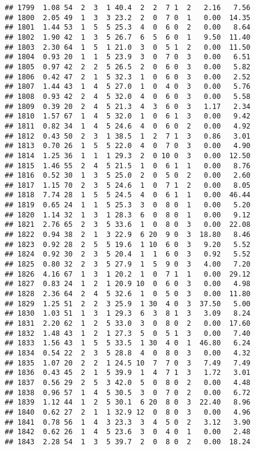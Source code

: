 \documentclass[
]{article}
\begin{document}
\begin{verbatim}
## 1799  1.08 54  2  3  1 40.4  2  2  7 1  2   2.16   7.56
## 1800  2.05 49  1  3  3 23.2  2  0  7 0  1   0.00  14.35
## 1801  1.44 53  1  5  5 25.3  4  0  6 0  2   0.00   8.64
## 1802  1.90 42  1  3  5 26.7  6  5  6 0  1   9.50  11.40
## 1803  2.30 64  1  5  1 21.0  3  0  5 1  2   0.00  11.50
## 1804  0.93 20  1  1  5 23.9  3  0  7 0  3   0.00   6.51
## 1805  0.97 42  2  2  5 26.5  2  0  6 0  3   0.00   5.82
## 1806  0.42 47  2  1  5 32.3  1  0  6 0  3   0.00   2.52
## 1807  1.44 43  1  4  5 27.0  1  0  4 0  3   0.00   5.76
## 1808  0.93 42  2  4  5 32.0  4  0  6 0  3   0.00   5.58
## 1809  0.39 20  2  4  5 21.3  4  3  6 0  3   1.17   2.34
## 1810  1.57 67  1  4  5 32.0  1  0  6 1  3   0.00   9.42
## 1811  0.82 34  1  4  5 24.6  4  0  6 0  2   0.00   4.92
## 1812  0.43 50  2  3  1 38.5  1  2  7 1  3   0.86   3.01
## 1813  0.70 26  1  5  5 22.0  4  0  7 0  3   0.00   4.90
## 1814  1.25 36  1  1  1 29.3  2  0 10 0  3   0.00  12.50
## 1815  1.46 55  2  4  5 21.5  1  0  6 1  1   0.00   8.76
## 1816  0.52 30  1  3  5 25.0  2  0  5 0  2   0.00   2.60
## 1817  1.15 70  2  3  5 24.6  1  0  7 1  2   0.00   8.05
## 1818  7.74 28  1  5  5 24.5  4  0  6 1  1   0.00  46.44
## 1819  0.65 24  1  1  5 25.3  3  0  8 0  1   0.00   5.20
## 1820  1.14 32  1  3  1 28.3  6  0  8 0  1   0.00   9.12
## 1821  2.76 65  2  3  5 33.6  1  0  8 0  3   0.00  22.08
## 1822  0.94 38  2  1  3 22.9  6 20  9 0  3  18.80   8.46
## 1823  0.92 28  2  5  5 19.6  1 10  6 0  3   9.20   5.52
## 1824  0.92 30  2  3  5 20.4  1  1  6 0  3   0.92   5.52
## 1825  0.80 32  2  3  5 27.9  1  5  9 0  3   4.00   7.20
## 1826  4.16 67  1  3  1 20.2  1  0  7 1  1   0.00  29.12
## 1827  0.83 24  1  2  1 20.9 10  0  6 0  3   0.00   4.98
## 1828  2.36 64  2  4  5 32.6  1  0  5 0  3   0.00  11.80
## 1829  1.25 51  2  2  3 25.9  1 30  4 0  3  37.50   5.00
## 1830  1.03 51  1  3  1 29.3  6  3  8 1  3   3.09   8.24
## 1831  2.20 62  1  2  5 33.0  3  0  8 0  2   0.00  17.60
## 1832  1.48 43  1  2  1 27.3  5  0  5 1  3   0.00   7.40
## 1833  1.56 43  1  5  5 33.5  1 30  4 0  1  46.80   6.24
## 1834  0.54 22  2  3  5 28.8  4  0  8 0  3   0.00   4.32
## 1835  1.07 20  2  2  1 24.5 10  7  7 0  3   7.49   7.49
## 1836  0.43 45  2  1  5 39.9  1  4  7 1  3   1.72   3.01
## 1837  0.56 29  2  5  3 42.0  5  0  8 0  2   0.00   4.48
## 1838  0.96 57  1  4  5 30.5  3  0  7 0  2   0.00   6.72
## 1839  1.12 44  1  2  5 30.1  6 20  8 0  3  22.40   8.96
## 1840  0.62 27  2  1  1 32.9 12  0  8 0  3   0.00   4.96
## 1841  0.78 56  1  4  3 23.3  3  4  5 0  2   3.12   3.90
## 1842  0.62 26  1  4  5 23.6  3  0  4 0  1   0.00   2.48
## 1843  2.28 54  1  3  5 39.7  2  0  8 0  2   0.00  18.24

\end{verbatim}
\end{document}
